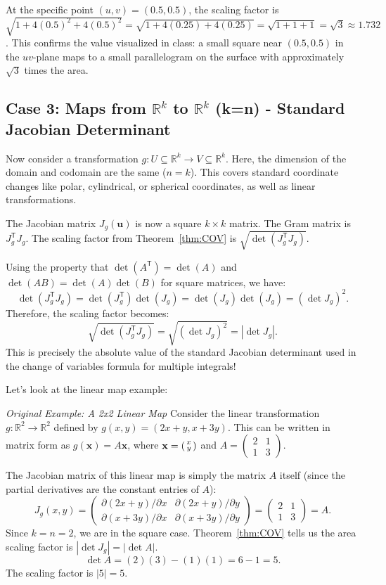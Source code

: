 \documentclass[12pt]{article}
\theoremstyle{definition} %
\theoremstyle{plain} %
\theoremstyle{remark} %
\begin{document}
At the specific point $(u,v) = (0.5, 0.5)$, the scaling factor is $\sqrt{1 + 4(0.5)^2 + 4(0.5)^2} = \sqrt{1 + 4(0.25) + 4(0.25)} = \sqrt{1+1+1} = \sqrt{3} \approx 1.732$. This confirms the value visualized in class: a small square near $(0.5, 0.5)$ in the $uv$-plane maps to a small parallelogram on the surface with approximately $\sqrt{3}$ times the area.

\subsection{Case 3: Maps from \texorpdfstring{$\mathbb{R}^k$}{R^k} to \texorpdfstring{$\mathbb{R}^k$}{R^k} (k=n) - Standard Jacobian Determinant}

Now consider a transformation $g: U \subseteq \mathbb{R}^k \to V \subseteq \mathbb{R}^k$. Here, the dimension of the domain and codomain are the same ($n=k$). This covers standard coordinate changes like polar, cylindrical, or spherical coordinates, as well as linear transformations.

The Jacobian matrix $J_g(\mathbf{u})$ is now a square $k \times k$ matrix.
The Gram matrix is $J_g^{\mathsf{T}} J_g$.
The scaling factor from Theorem~\ref{thm:COV} is $\sqrt{\det(J_g^{\mathsf{T}} J_g)}$.

Using the property that $\det(A^{\mathsf{T}}) = \det(A)$ and $\det(AB) = \det(A)\det(B)$ for square matrices, we have:
\[
    \det(J_g^{\mathsf{T}} J_g) = \det(J_g^{\mathsf{T}}) \det(J_g) = \det(J_g) \det(J_g) = (\det J_g)^2.
\]
Therefore, the scaling factor becomes:
\[
    \sqrt{\det(J_g^{\mathsf{T}} J_g)} = \sqrt{(\det J_g)^2} = |\det J_g|.
\]
This is precisely the absolute value of the standard Jacobian determinant used in the change of variables formula for multiple integrals!

Let's look at the linear map example:

\textit{Original Example: A 2x2 Linear Map}
Consider the linear transformation $g: \mathbb{R}^2 \to \mathbb{R}^2$ defined by $g(x,y) = (2x+y, x+3y)$. This can be written in matrix form as $g(\mathbf{x}) = A \mathbf{x}$, where $\mathbf{x} = \begin{psmallmatrix} x \\ y \end{psmallmatrix}$ and $A = \begin{pmatrix} 2 & 1 \\ 1 & 3 \end{pmatrix}$.

The Jacobian matrix of this linear map is simply the matrix $A$ itself (since the partial derivatives are the constant entries of $A$):
\[
    J_g(x,y) = \begin{pmatrix} \partial(2x+y)/\partial x & \partial(2x+y)/\partial y \\ \partial(x+3y)/\partial x & \partial(x+3y)/\partial y \end{pmatrix} = \begin{pmatrix} 2 & 1 \\ 1 & 3 \end{pmatrix} = A.
\]
Since $k=n=2$, we are in the square case. Theorem~\ref{thm:COV} tells us the area scaling factor is $|\det J_g| = |\det A|$.
\[
    \det A = (2)(3) - (1)(1) = 6 - 1 = 5.
\]
The scaling factor is $|5| = 5$.
\end{document}
